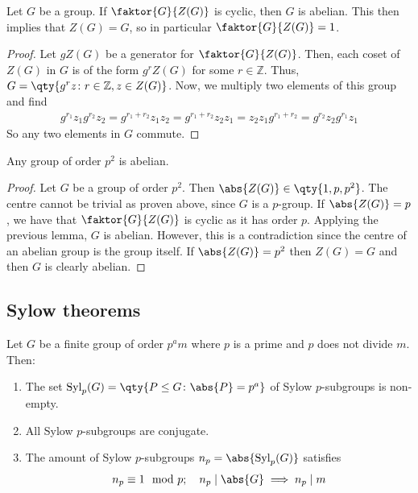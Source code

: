 \begin{lemma}
	Let $G$ be a group.
	If $\faktor{G}{Z(G)}$ is cyclic, then $G$ is abelian.
	This then implies that $Z(G) = G$, so in particular $\faktor{G}{Z(G)} = 1$.
\end{lemma}

\begin{proof}
	Let $g Z(G)$ be a generator for $\faktor{G}{Z(G)}$.
	Then, each coset of $Z(G)$ in $G$ is of the form $g^r Z(G)$ for some $r \in \mathbb Z$.
	Thus, $G = \qty{g^r z \colon r \in \mathbb Z, z \in Z(G)}$.
	Now, we multiply two elements of this group and find
	\begin{align*}
		g^{r_1} z_1 g^{r_2} z_2 = g^{r_1 + r_2} z_1 z_2 = g^{r_1 + r_2} z_2 z_1 = z_2 z_1 g^{r_1 + r_2} = g^{r_2} z_2 g^{r_1} z_1
	\end{align*}
	So any two elements in $G$ commute.
\end{proof}

\begin{corollary}
	Any group of order $p^2$ is abelian.
\end{corollary}

\begin{proof}
	Let $G$ be a group of order $p^2$.
	Then $\abs{Z(G)} \in \qty{1, p, p^2}$.
	The centre cannot be trivial as proven above, since $G$ is a $p$-group.
	If $\abs{Z(G)} = p$, we have that $\faktor{G}{Z(G)}$ is cyclic as it has order $p$.
	Applying the previous lemma, $G$ is abelian.
	However, this is a contradiction since the centre of an abelian group is the group itself.
	If $\abs{Z(G)} = p^2$ then $Z(G) = G$ and then $G$ is clearly abelian.
\end{proof}

\subsection{Sylow theorems}
\begin{theorem}
	Let $G$ be a finite group of order $p^a m$ where $p$ is a prime and $p$ does not divide $m$.
	Then:
	\begin{enumerate}
		\item The set $\mathrm{Syl}_p(G) = \qty{P \leq G \colon \abs{P} = p^a}$ of Sylow $p$-subgroups is non-empty.
		\item All Sylow $p$-subgroups are conjugate.
		\item The amount of Sylow $p$-subgroups $n_p = \abs{\mathrm{Syl}_p(G)}$ satisfies
		      \begin{align*}
			      n_p \equiv 1 \mod p;\quad n_p \mid \abs{G} \implies n_p \mid m
		      \end{align*}
	\end{enumerate}
\end{theorem}

